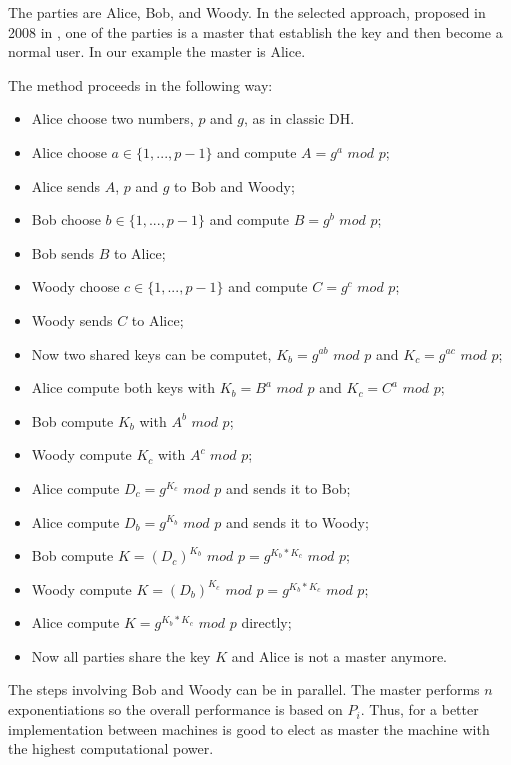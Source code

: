 \documentclass[11pt]{article}
\begin{document}
The parties are Alice, Bob, and Woody. In the selected approach, proposed in 2008 in \cite{Biswas}, one of the parties is a master that establish the key and then become a normal user. In our example the master is Alice.

The method proceeds in the following way:

\begin{itemize}
    \item Alice choose two numbers, $p$ and $g$, as in classic DH.
    \item Alice choose $a \in \{1, ..., p-1\}$ and compute $A = g^a$ $mod$ $p$;
    \item Alice sends $A$, $p$ and $g$ to Bob and Woody;
    \item Bob choose $b \in \{1, ..., p-1\}$ and compute $B = g^b$ $mod$ $p$;
    \item Bob sends $B$ to Alice;
    \item Woody choose $c \in \{1, ..., p-1\}$ and compute $C = g^c$ $mod$ $p$;
    \item Woody sends $C$ to Alice;
    \item Now two shared keys can be computet, $K_b = g^{ab}$ $mod$ $p$ and $K_c = g^{ac}$ $mod$ $p$;
    \item Alice compute both keys with $K_b = B^a$ $mod$ $p$ and $K_c = C^a$ $mod$ $p$;
    \item Bob compute $K_b$ with $A^b$ $mod$ $p$;
    \item Woody compute $K_c$ with $A^c$ $mod$ $p$;
    \item Alice compute $D_c = g^{K_c}$ $mod$ $p$ and sends it to Bob;
    \item Alice compute $D_b = g^{K_b}$ $mod$ $p$ and sends it to Woody;
    \item Bob compute $K = (D_c)^{K_b}$ $mod$ $p = g^{K_b*K_c}$ $mod$ $p$;
    \item Woody compute $K = (D_b)^{K_c}$ $mod$ $p = g^{K_b*K_c}$ $mod$ $p$;
    \item Alice compute $K = g^{K_b*K_c}$ $mod$ $p$ directly;
    \item Now all parties share the key $K$ and Alice is not a master anymore.
\end{itemize}

The steps involving Bob and Woody can be in parallel. The master performs $n$ exponentiations so the overall performance is based on $P_i$. Thus, for a better implementation between machines is good to elect as master the machine with the highest computational power.
\end{document}
